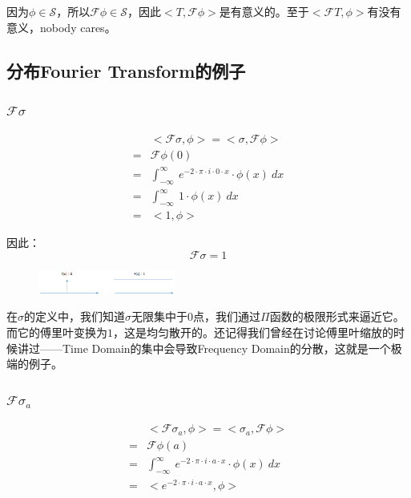 因为$\phi\in \mathcal  {S}$，所以$\mathcal{F}\phi\in \mathcal  {S}$，因此$<T,\mathcal{F}\phi>$是有意义的。至于$<\mathcal{F}T,\phi>$有没有意义，nobody cares。
\subsection{分布Fourier Transform的例子}
\subsubsection{$\mathcal{F}\sigma$}
\begin{align*}
	  & <\mathcal{F}\sigma,\phi>  =  <\sigma,\mathcal{F}\phi>                          \\
	= & \mathcal{F}\phi(0)                                                             \\
	= & \int_{-\infty}^{\infty}\ e^{-2\cdot \pi\cdot i\cdot 0\cdot x}\cdot \phi(x)\ dx \\
	= & \int_{-\infty}^{\infty}\ 1\cdot \phi(x)\ dx                                    \\
	= & <1,\phi>
\end{align*}

因此：
\begin{equation}
	\mathcal{F}\sigma=1
\end{equation}
\begin{figure}[H]
	\centering
	\includegraphics[width=0.4\textwidth]{assets/fdelta.png}
\end{figure}
在$\sigma$的定义中，我们知道$\sigma$无限集中于$0$点，我们通过$\Pi$函数的极限形式来逼近它。而它的傅里叶变换为$1$，这是均匀散开的。还记得我们曾经在讨论傅里叶缩放的时候讲过——Time Domain的集中会导致Frequency Domain的分散，这就是一个极端的例子。
\subsubsection{$\mathcal{F}\sigma_a$}
\begin{align*}
	  & <\mathcal{F}\sigma_a,\phi>  =  <\sigma_a,\mathcal{F}\phi>                      \\
	= & \mathcal{F}\phi(a)                                                             \\
	= & \int_{-\infty}^{\infty}\ e^{-2\cdot \pi\cdot i\cdot a\cdot x}\cdot \phi(x)\ dx \\
	= & <e^{-2\cdot \pi\cdot i\cdot a\cdot x},\phi>
\end{align*}

